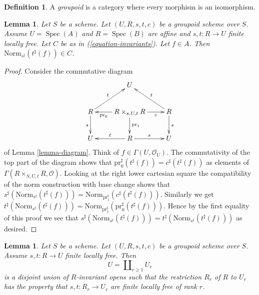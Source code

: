 \documentclass{amsart}
\theoremstyle{plain}
\newtheorem{lemma}[subsection]{Lemma}
\theoremstyle{definition}
\newtheorem{definition}[subsection]{Definition}
\theoremstyle{remark}
\numberwithin{equation}{subsection}
\def\Spec{\mathop{\mathrm{Spec}}}
\begin{document}
\begin{definition}
\label{categories-definition-groupoid}
A {\it groupoid} is a category where every morphism is an isomorphism.
\end{definition}

\begin{lemma}
\label{lemma-determinant-trick}
Let $S$ be a scheme. Let $(U, R, s, t, c)$ be a groupoid scheme over $S$.
Assume $U = \Spec(A)$ and $R = \Spec(B)$ are affine and
$s, t : R \to U$ finite locally free.
Let $C$ be as in (\ref{equation-invariants}).
Let $f \in A$. Then $\text{Norm}_{s^\sharp}(t^\sharp(f)) \in C$.
\end{lemma}

\begin{proof}
Consider the commutative diagram
$$
\xymatrix{
& U & \\
R \ar[d]_s \ar[ru]^t &
R \times_{s, U, t} R
\ar[l]^-{\text{pr}_0} \ar[d]^{\text{pr}_1} \ar[r]_-c &
R \ar[d]^s \ar[lu]_t \\
U & R \ar[l]_t \ar[r]^s & U
}
$$
of Lemma \ref{lemma-diagram}.
Think of $f \in \Gamma(U, \mathcal{O}_U)$. The commutativity of the
top part of the diagram shows that
$\text{pr}_0^\sharp(t^\sharp(f)) = c^\sharp(t^\sharp(f))$ as elements of
$\Gamma(R \times_{S, U, t} R, \mathcal{O})$.
Looking at the right lower cartesian square
the compatibility of the norm construction with base change shows that
$s^\sharp(\text{Norm}_{s^\sharp}(t^\sharp(f))) =
\text{Norm}_{\text{pr}_1^\sharp}(c^\sharp(t^\sharp(f)))$.
Similarly we get
$t^\sharp(\text{Norm}_{s^\sharp}(t^\sharp(f))) =
\text{Norm}_{\text{pr}_1^\sharp}(\text{pr}_0^\sharp(t^\sharp(f)))$.
Hence by the first equality of this proof we see that
$s^\sharp(\text{Norm}_{s^\sharp}(t^\sharp(f))) =
t^\sharp(\text{Norm}_{s^\sharp}(t^\sharp(f)))$ as desired.
\end{proof}


\begin{lemma}
\label{lemma-finite-locally-free-disjoint-free}
Let $S$ be a scheme. Let $(U, R, s, t, c)$ be a groupoid scheme over $S$.
Assume $s, t : R \to U$ finite locally free.
Then
$$
U = \coprod\nolimits_{r \geq 1} U_r
$$
is a disjoint union of $R$-invariant opens such that the restriction $R_r$ of
$R$ to $U_r$ has the property that $s, t : R_r \to U_r$ are finite locally
free of rank $r$.
\end{lemma}
\end{document}
